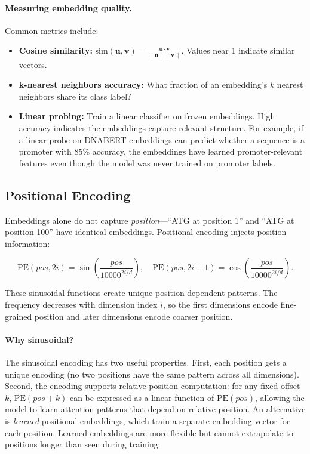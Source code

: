 \paragraph{Measuring embedding quality.} Common metrics include:
\begin{itemize}[leftmargin=1.5em]
  \item \textbf{Cosine similarity:} $\text{sim}(\mathbf{u}, \mathbf{v}) = \frac{\mathbf{u} \cdot \mathbf{v}}{\|\mathbf{u}\| \|\mathbf{v}\|}$. Values near 1 indicate similar vectors.
  \item \textbf{k-nearest neighbors accuracy:} What fraction of an embedding's $k$ nearest neighbors share its class label?
  \item \textbf{Linear probing:} Train a linear classifier on frozen embeddings. High accuracy indicates the embeddings capture relevant structure. For example, if a linear probe on DNABERT embeddings can predict whether a sequence is a promoter with 85\% accuracy, the embeddings have learned promoter-relevant features even though the model was never trained on promoter labels.
\end{itemize}

\subsection{Positional Encoding}

Embeddings alone do not capture \emph{position}---``ATG at position 1'' and ``ATG at position 100'' have identical embeddings. Positional encoding injects position information:

\begin{equation}
\text{PE}(pos, 2i) = \sin\!\left(\frac{pos}{10000^{2i/d}}\right), \quad
\text{PE}(pos, 2i+1) = \cos\!\left(\frac{pos}{10000^{2i/d}}\right).
\end{equation}

These sinusoidal functions create unique position-dependent patterns. The frequency decreases with dimension index $i$, so the first dimensions encode fine-grained position and later dimensions encode coarser position.

\paragraph{Why sinusoidal?} The sinusoidal encoding has two useful properties. First, each position gets a unique encoding (no two positions have the same pattern across all dimensions). Second, the encoding supports relative position computation: for any fixed offset $k$, $\text{PE}(pos + k)$ can be expressed as a linear function of $\text{PE}(pos)$, allowing the model to learn attention patterns that depend on relative position. An alternative is \emph{learned} positional embeddings, which train a separate embedding vector for each position. Learned embeddings are more flexible but cannot extrapolate to positions longer than seen during training.

